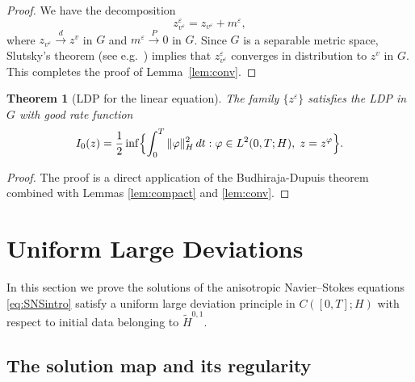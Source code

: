 \documentclass[11pt,a4paper,reqno]{amsart}
\newtheorem{theorem}{Theorem}[section]
\theoremstyle{definition}
\begin{document}
\begin{proof}
We have the decomposition
\[
  z^\varepsilon_{v^\varepsilon} = z_{v^\varepsilon} + m^\varepsilon,
\]
where $z_{v^\varepsilon} \xrightarrow{\;d\;} z^v$ in $G$ and $m^\varepsilon \xrightarrow{\;P\;} 0$ in $G$.
Since $G$ is a separable metric space, Slutsky's theorem (see e.g.\ \cite{Billingsley})
implies that $z^\varepsilon_{v^\varepsilon}$ converges in distribution to $z^v$ in $G$.
This completes the proof of Lemma~\ref{lem:conv}.
\end{proof}

\begin{theorem}[LDP for the linear equation]\label{th:linLDP}
  The family \(\{z^\varepsilon\}\) satisfies the LDP in \(G\) with good rate function
  \[
    I_0(z) = \frac12 \inf\Bigl\{ \int_0^T \|\varphi\|_{H}^2\,dt : \varphi\in L^2(0,T;H),\; z = z^\varphi \Bigr\}.
  \]
\end{theorem}
\begin{proof}
The proof is a direct application of the Budhiraja-Dupuis theorem \cite{BD,BDM} combined with Lemmas \ref{lem:compact} and \ref{lem:conv}.
\end{proof}

\section{Uniform Large Deviations}
\label{sec:nonlinear}

In this section we prove the solutions of the
anisotropic Navier--Stokes equations \eqref{eq:SNSintro} satisfy a uniform large deviation
principle in $C([0,T];H)$ with respect to initial data belonging to $\widetilde H^{0,1}$.

\subsection{The solution map and its regularity}
\label{sec:map}
\end{document}
